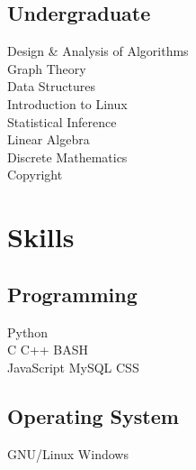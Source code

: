 \documentclass[]{deedy-resume-openfont}
\begin{document}
\begin{minipage}[t]{0.33\textwidth}


\subsection{Undergraduate}
Design \& Analysis of Algorithms \\
Graph Theory \\
Data Structures \\
Introduction to Linux \\
Statistical Inference \\
Linear Algebra \\
Discrete Mathematics \\
Copyright
\sectionsep


\section{Skills}
\subsection{Programming}
\textbullet{} Python \\
\textbullet{} C \textbullet{} C++ \textbullet{} BASH \\
\textbullet{} JavaScript \textbullet{} MySQL \textbullet{} CSS \\
\subsection{Operating System}
\textbullet{} GNU/Linux \textbullet{} Windows

\end{minipage}
\end{document}
